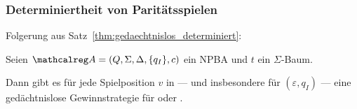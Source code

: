 \begin{frame}
  \frametitle{Determiniertheit von Paritätsspielen}

  Folgerung aus Satz~\ref{thm:gedaechtnislos_determiniert}:

  \begin{Folgerung}
    Seien $\Aut{A} = (Q,\Sigma,\Delta,\{q_I\},c)$ ein NPBA und $t$ ein $\Sigma$-Baum.
    \par\smallskip
    Dann gibt es für jede Spielposition $v$ in 
    --- und insbesondere für $(\varepsilon,q_I)$ ---
    eine gedächtnislose Gewinnstrategie für \AUT oder \PF.%
    \label{cor:gedaechtnislose_determiniertheit}%
  \end{Folgerung}

  \par\bigskip

\end{frame}

